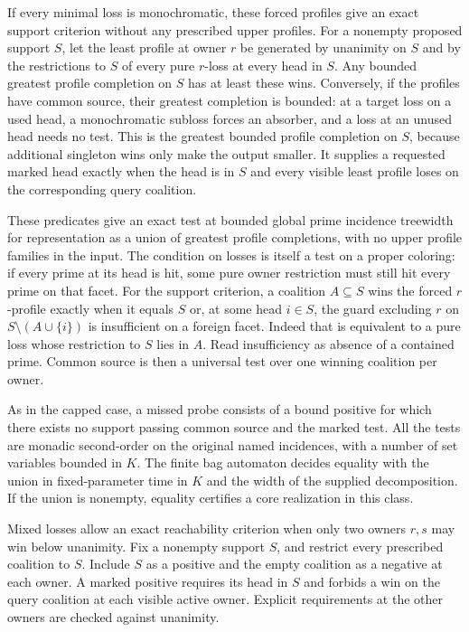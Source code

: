 If every minimal loss is monochromatic, these forced
profiles give an exact support criterion without any
prescribed upper profiles. For a nonempty proposed
support $S$, let the least profile at owner $r$ be
generated by unanimity on $S$ and by the restrictions
to $S$ of every pure $r$-loss at every head in $S$.
Any bounded greatest profile completion on $S$ has
at least these wins. Conversely, if the profiles have
common source, their greatest completion is bounded:
at a target loss on a used head, a monochromatic
subloss forces an absorber, and a loss at an unused
head needs no test. This is the greatest bounded
profile completion on $S$, because additional
singleton wins only make the output smaller. It
supplies a requested marked head exactly when the
head is in $S$ and every visible least profile loses
on the corresponding query coalition.

These predicates give an exact test at bounded
global prime incidence treewidth for representation
as a union of greatest profile completions, with no
upper profile families in the input. The condition
on losses is itself a test on a proper coloring:
if every prime at its head is hit, some pure
owner restriction must still hit every prime on
that facet. For the support criterion, a coalition
$A\subseteq S$ wins the forced $r$-profile exactly
when it equals $S$ or, at some head $i\in S$, the
guard excluding $r$ on $S\setminus(A\cup\{i\})$
is insufficient on a foreign facet. Indeed that
is equivalent to a pure loss whose restriction
to $S$ lies in $A$. Read insufficiency as absence
of a contained prime. Common source is then a
universal test over one winning coalition per owner.

As in the capped case, a missed probe consists of
a bound positive for which there exists no support
passing common source and the marked test. All the
tests are monadic second-order on the original named
incidences, with a number of set variables bounded
in $K$. The finite bag automaton decides equality
with the union in fixed-parameter time in $K$ and
the width of the supplied decomposition. If the
union is nonempty, equality certifies a core
realization in this class.

Mixed losses allow an exact reachability criterion when
only two owners $r,s$ may win below unanimity. Fix a
nonempty support $S$, and restrict every prescribed
coalition to $S$. Include $S$ as a positive and the
empty coalition as a negative at each owner. A marked
positive requires its head in $S$ and forbids a win
on the query coalition at each visible active owner.
Explicit requirements at the other owners are checked
against unanimity.

